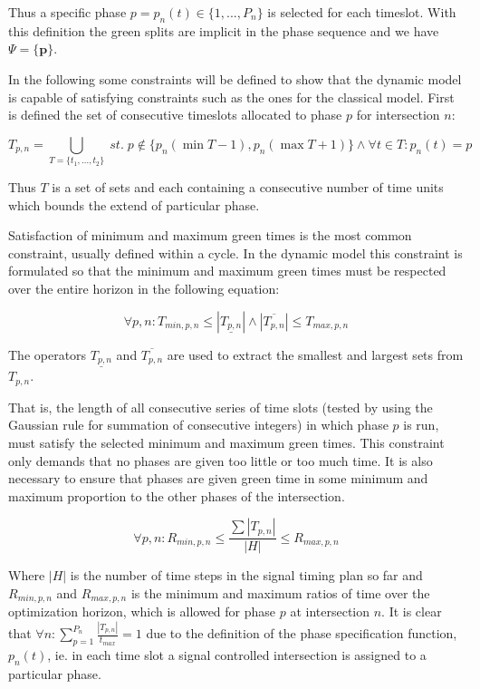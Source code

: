 Thus a specific phase $p = p_n(t) \in \lbrace 1,...,P_n \rbrace$ is selected for each timeslot. With this definition the green splits are implicit in the phase sequence and we have $\Psi = \lbrace \textbf{p} \rbrace $.

In the following some constraints will be defined to show that the dynamic model is capable of satisfying constraints such as the ones for the classical model. First is defined the set of consecutive timeslots allocated to phase $p$ for intersection $n$:

\begin{equation}
T_{p,n} = \bigcup_{T = \lbrace t_1,...,t_2 \rbrace} \; st. \; p \not \in \lbrace p_n(\min T - 1), p_n(\max T + 1) \rbrace \wedge\forall t \in T: p_n(t) = p 
\end{equation}

Thus $T$ is a set of sets and each containing a consecutive number of time units which bounds the extend of particular phase.

Satisfaction of minimum and maximum green times is the most common constraint, usually defined within a cycle. In the dynamic model this constraint is formulated so that the minimum and maximum green times must be respected over the entire horizon in the following equation:

\begin{equation}
\label{eqn:minmaxtimes}
\forall p,n : T_{min,p,n} \leq |\underline{T_{p,n}}| \wedge |\overline{T_{p,n}}| \leq T_{max,p,n} 
\end{equation}

The operators $\underline{T_{p,n}}$ and $\overline{T_{p,n}}$ are used to extract the smallest and largest sets from $T_{p,n}$.

That is, the length of all consecutive series of time slots (tested by using the Gaussian rule for summation of consecutive integers) in which phase $p$ is run, must satisfy the selected minimum and maximum green times. This constraint only demands that no phases are given too little or too much time. It is also necessary to ensure that phases are given green time in some minimum and maximum proportion to the other phases of the intersection.

\begin{equation}
\label{eqn:proportions}
\forall p,n : R_{min,p,n} \leq \frac{\sum |T_{p,n}|}{|H|} \leq R_{max,p,n}
\end{equation}

Where $|H|$ is the number of time steps in the signal timing plan so far and $R_{min,p,n}$ and $R_{max,p,n}$ is the minimum and maximum ratios of time over the optimization horizon, which is allowed for phase $p$ at intersection $n$. It is clear that $\forall n : \displaystyle\sum_{p=1}^{P_n}\frac{|T_{p,n}|}{t_{max}} = 1$ due to the definition of the phase specification function, $p_n(t)$,  ie. in each time slot a signal controlled intersection is assigned to a particular phase.

